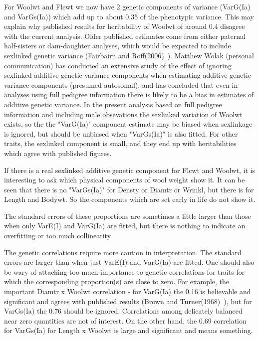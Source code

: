 \documentclass[titlepage]{article}  %
\begin{document}
For Woolwt and Flcwt we now have 2 genetic components of variance (VarG(Ia) and VarGs(Ia)) which add up to about 0.35 of the phenotypic variance. This may explain why published results for heritability of Woolwt of around 0.4 disagree with the current analysis. Older published estimates come from either paternal half-sisters or dam-daughter analyses, which would be expected to include sexlinked genetic variance (Fairbairn and Roff(2006)~\cite{fair:06}). Matthew Wolak (personal communication) has conducted an extensive study of the effect of ignoring sexlinked additive genetic variance components when estimating additive genetic variance components (presumed autosomal), and has concluded that even in analyses using full pedigree information there is likely to be a bias in estimates of additive genetic variance. In the present analysis based on full pedigree information and including male obsevations the sexlinked variation of Woolwt exists, so the the "VarG(Ia)" component estimate may be biased when sexlinkage is ignored, but should be unbiased when "VarGs(Ia)" is also fitted. For other traits, the sexlinked component is small, and they end up with heritabilities which agree with published figures. 

If there is a real sexlinked additive genetic component for Flcwt and Woolwt, it is interesting to ask which physical components of wool weight show it. It can be seen that there is no "VarGs(Ia)" for Densty or Diamtr or Wrinkl, but there is for Length and Bodywt. So the components which are set early in life do not show it.

The standard errors of these proportions are sometimes a little larger than those when only VarE(I) and VarG(Ia) are fitted, but there is nothing to indicate an overfitting or too much collinearity. 

The genetic correlations require more caution in interpretation. The standard errors are larger than when just VarE(I) and VarG(Ia) are fitted. One should also be wary of attaching too much importance to genetic correlations for traits for which the corresponding proportion(s) are close to zero. For example, the important Diamtr x Woolwt correlation - for VarG(Ia) the 0.16 is believable and significant and agrees with published results (Brown and Turner(1968)~\cite{brow:68}), but for VarGs(Ia) the 0.76 should be ignored. Correlations among delicately balanced near zero quantities are not of interest. On the other hand, the 0.69 correlation for VarGs(Ia) for Length x Woolwt is large and significant and means something.
\end{document}
